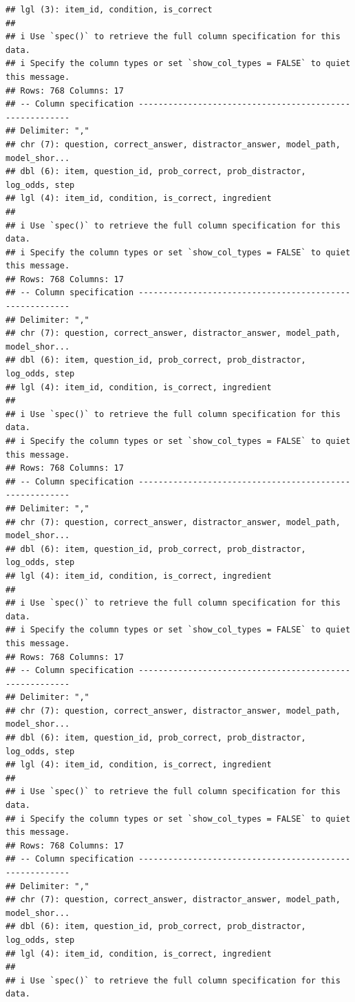 \documentclass[
]{article}
\begin{document}
\begin{verbatim}
## lgl (3): item_id, condition, is_correct
## 
## i Use `spec()` to retrieve the full column specification for this data.
## i Specify the column types or set `show_col_types = FALSE` to quiet this message.
## Rows: 768 Columns: 17
## -- Column specification --------------------------------------------------------
## Delimiter: ","
## chr (7): question, correct_answer, distractor_answer, model_path, model_shor...
## dbl (6): item, question_id, prob_correct, prob_distractor, log_odds, step
## lgl (4): item_id, condition, is_correct, ingredient
## 
## i Use `spec()` to retrieve the full column specification for this data.
## i Specify the column types or set `show_col_types = FALSE` to quiet this message.
## Rows: 768 Columns: 17
## -- Column specification --------------------------------------------------------
## Delimiter: ","
## chr (7): question, correct_answer, distractor_answer, model_path, model_shor...
## dbl (6): item, question_id, prob_correct, prob_distractor, log_odds, step
## lgl (4): item_id, condition, is_correct, ingredient
## 
## i Use `spec()` to retrieve the full column specification for this data.
## i Specify the column types or set `show_col_types = FALSE` to quiet this message.
## Rows: 768 Columns: 17
## -- Column specification --------------------------------------------------------
## Delimiter: ","
## chr (7): question, correct_answer, distractor_answer, model_path, model_shor...
## dbl (6): item, question_id, prob_correct, prob_distractor, log_odds, step
## lgl (4): item_id, condition, is_correct, ingredient
## 
## i Use `spec()` to retrieve the full column specification for this data.
## i Specify the column types or set `show_col_types = FALSE` to quiet this message.
## Rows: 768 Columns: 17
## -- Column specification --------------------------------------------------------
## Delimiter: ","
## chr (7): question, correct_answer, distractor_answer, model_path, model_shor...
## dbl (6): item, question_id, prob_correct, prob_distractor, log_odds, step
## lgl (4): item_id, condition, is_correct, ingredient
## 
## i Use `spec()` to retrieve the full column specification for this data.
## i Specify the column types or set `show_col_types = FALSE` to quiet this message.
## Rows: 768 Columns: 17
## -- Column specification --------------------------------------------------------
## Delimiter: ","
## chr (7): question, correct_answer, distractor_answer, model_path, model_shor...
## dbl (6): item, question_id, prob_correct, prob_distractor, log_odds, step
## lgl (4): item_id, condition, is_correct, ingredient
## 
## i Use `spec()` to retrieve the full column specification for this data.

\end{verbatim}
\end{document}
